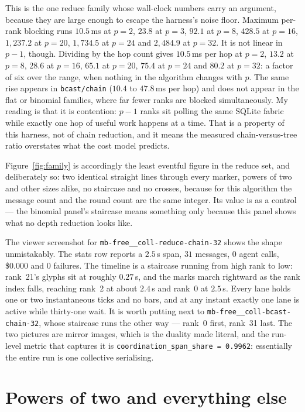 \documentclass[11pt]{article}
\begin{document}
This is the one reduce family whose wall-clock numbers carry an argument, because they are large
enough to escape the harness's noise floor. Maximum per-rank blocking runs $10.5$\,ms at $p=2$,
$23.8$ at $p=3$, $92.1$ at $p=8$, $428.5$ at $p=16$, $1{,}237.2$ at $p=20$, $1{,}734.5$ at
$p=24$ and $2{,}484.9$ at $p=32$. It is not linear in $p-1$, though. Dividing by the hop count
gives $10.5$\,ms per hop at $p=2$, $13.2$ at $p=8$, $28.6$ at $p=16$, $65.1$ at $p=20$, $75.4$
at $p=24$ and $80.2$ at $p=32$: a factor of six over the range, when nothing in the algorithm
changes with $p$. The same rise appears in \texttt{bcast/chain} ($10.4$ to $47.8$\,ms per hop)
and does not appear in the flat or binomial families, where far fewer ranks are blocked
simultaneously. My reading is that it is contention: $p-1$ ranks sit polling the same SQLite
fabric while exactly one hop of useful work happens at a time. That is a property of this
harness, not of chain reduction, and it means the measured chain-versus-tree ratio overstates
what the cost model predicts.

Figure~\ref{fig:family} is accordingly the least eventful figure in the reduce set, and
deliberately so: two identical straight lines through every marker, powers of two and other
sizes alike, no staircase and no crosses, because for this algorithm the message count and the
round count are the same integer. Its value is as a control --- the binomial panel's staircase
means something only because this panel shows what no depth reduction looks like.

The viewer screenshot for \texttt{mb-free\_\_coll-reduce-chain-32} shows the shape
unmistakably. The stats row reports a $2.5$\,s span, $31$ messages, $0$ agent calls, \$0.000 and
$0$ failures. The timeline is a staircase running from high rank to low: rank~21's glyphs sit at
roughly $0.27$\,s, and the marks march rightward as the rank index falls, reaching rank~2 at
about $2.4$\,s and rank~0 at $2.5$\,s. Every lane holds one or two instantaneous ticks and no
bars, and at any instant exactly one lane is active while thirty-one wait. It is worth putting
next to \texttt{mb-free\_\_coll-bcast-chain-32}, whose staircase runs the other way ---
rank~0 first, rank~31 last. The two pictures are mirror images, which is the duality made
literal, and the run-level metric that captures it is
\texttt{coordination\_span\_share = 0.9962}: essentially the entire run is one collective
serialising.

\section{Powers of two and everything else}
\end{document}
